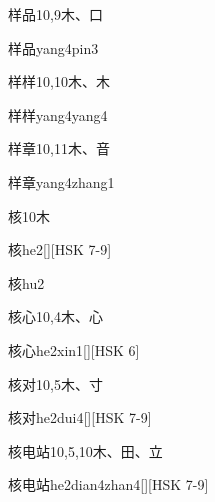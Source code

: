 \begin{Entry}{样品}{10,9}{⽊、⼝}
  \begin{Phonetics}{样品}{yang4pin3}
  \end{Phonetics}
\end{Entry}

\begin{Entry}{样样}{10,10}{⽊、⽊}
  \begin{Phonetics}{样样}{yang4yang4}
  \end{Phonetics}
\end{Entry}

\begin{Entry}{样章}{10,11}{⽊、⾳}
  \begin{Phonetics}{样章}{yang4zhang1}
  \end{Phonetics}
\end{Entry}

\begin{Entry}{核}{10}{⽊}
  \begin{Phonetics}{核}{he2}[][HSK 7-9]
  \end{Phonetics}
  \begin{Phonetics}{核}{hu2}
  \end{Phonetics}
\end{Entry}

\begin{Entry}{核心}{10,4}{⽊、⼼}
  \begin{Phonetics}{核心}{he2xin1}[][HSK 6]
  \end{Phonetics}
\end{Entry}

\begin{Entry}{核对}{10,5}{⽊、⼨}
  \begin{Phonetics}{核对}{he2dui4}[][HSK 7-9]
  \end{Phonetics}
\end{Entry}

\begin{Entry}{核电站}{10,5,10}{⽊、⽥、⽴}
  \begin{Phonetics}{核电站}{he2dian4zhan4}[][HSK 7-9]
  \end{Phonetics}
\end{Entry}

